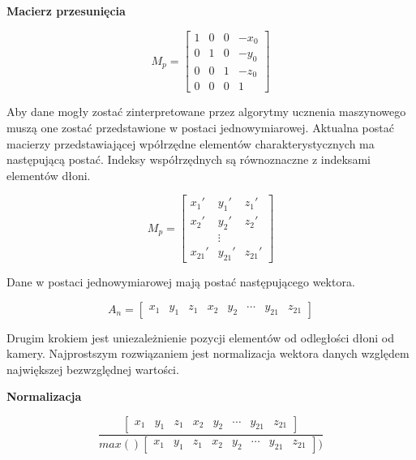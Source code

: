 \quad \textbf{Macierz przesunięcia}

\begin{equation*}
    M_p = 
    \begin{bmatrix}
    1 & 0 & 0 & -x_0 \\
    0 & 1 & 0 & -y_0 \\
    0 & 0 & 1 & -z_0 \\
    0 & 0 & 0 & 1
    \end{bmatrix}
\end{equation*}

\quad Aby dane mogły zostać zinterpretowane przez algorytmy ucznenia maszynowego muszą one zostać przedstawione w postaci jednowymiarowej. Aktualna postać macierzy przedstawiającej wpółrzędne elementów charakterystycznych ma następującą postać. Indeksy współrzędnych są równoznaczne z indeksami elementów dłoni. 

\begin{equation*}
    M_p = 
    \begin{bmatrix}
    x_1' & y_1' & z_1' \\
    x_2' & y_2' & z_2' \\
     & \vdots &     \\
    x_{21}' & y_{21}' & z_{21}'
    \end{bmatrix}
\end{equation*}

Dane w postaci jednowymiarowej mają postać następującego wektora. 

\begin{equation*}
    A_n=
    \begin{bmatrix}
        x_1 & y_1 & z_1 & x_2 & y_2 & \cdots & y_{21} & z_{21}
    \end{bmatrix}
\end{equation*}


\quad Drugim krokiem jest uniezależnienie pozycji elementów od odległości dłoni od kamery. Najprostszym rozwiązaniem jest normalizacja wektora danych względem największej bezwzględnej wartości. 

\quad \textbf{Normalizacja}



\begin{equation*}
    \dfrac{    
        \begin{bmatrix}
            x_1 & y_1 & z_1 & x_2 & y_2 & \cdots & y_{21} & z_{21}
        \end{bmatrix}}
        {max()
            \begin{bmatrix}
            x_1 & y_1 & z_1 & x_2 & y_2 & \cdots & y_{21} & z_{21}
        \end{bmatrix})}
\end{equation*}

